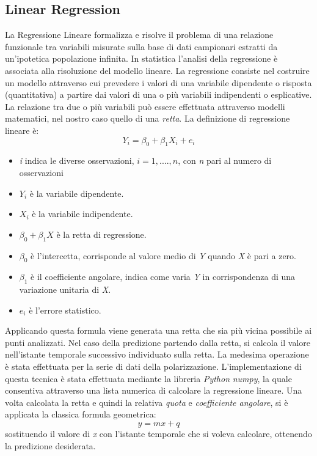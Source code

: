\subsection{Linear Regression}
La Regressione Lineare formalizza e risolve il problema di una relazione funzionale tra variabili misurate sulla base di dati campionari estratti da un'ipotetica popolazione infinita. In statistica l'analisi della regressione è associata alla risoluzione del modello lineare.
La regressione consiste nel costruire un modello attraverso cui prevedere i valori di una variabile dipendente o risposta (quantitativa) a partire dai valori di una o più variabili indipendenti o esplicative.
La relazione tra due o più variabili può essere effettuata attraverso modelli matematici, nel nostro caso quello di una \textit{retta}.
La definizione di regressione lineare è:
\begin{equation}
Y_{i}= \beta_{0} + \beta_{1}X_{i} + e_{i}
\end{equation}
\begin{itemize}
\item \textit{i} indica le diverse osservazioni, $i= 1,....,n$, con \textit{n} pari al numero di osservazioni
\item $Y_{i}$ è la variabile dipendente.
\item $X_{i}$ è la variabile indipendente.
\item $\beta_{0} + \beta_{1}X$ è la retta di regressione. 
\item $\beta_{0}$ è l'intercetta, corrisponde al valore medio di \textit{Y} quando \textit{X} è pari a zero.
\item $\beta_{1}$ è il coefficiente angolare, indica come varia \textit{Y} in corrispondenza di una variazione unitaria di \textit{X}.
\item $e_{i}$ è l'errore statistico.

\end{itemize}
Applicando questa formula viene generata una retta che sia più vicina possibile ai punti analizzati. Nel caso della predizione partendo dalla retta, si calcola il valore nell'istante temporale successivo individuato sulla retta. La medesima operazione è stata effettuata per la serie di dati della polarizzazione.
L'implementazione di questa tecnica è stata effettuata mediante la libreria \textit{Python} \textit{numpy}, la quale consentiva attraverso una lista numerica di calcolare la regressione lineare.
Una volta calcolata la retta e quindi la relativa \textit{quota} e \textit{coefficiente angolare}, si è applicata la classica formula geometrica:
\begin{equation}
y=mx+q
\end{equation}
sostituendo il valore di \textit{x} con l'istante temporale che si voleva calcolare, ottenendo la predizione desiderata.
